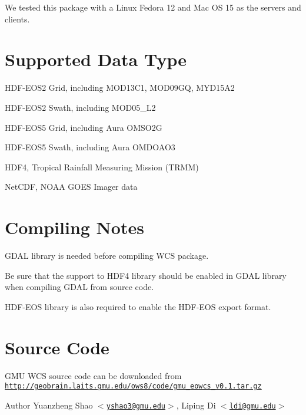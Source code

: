 We tested this package with a Linux Fedora 12 and Mac OS 15 as the servers and clients.\hypertarget{index_supportformats}{}\section{Supported Data Type}\label{index_supportformats}

\begin{DoxyItemize}
\item HDF-\/EOS2 Grid, including MOD13C1, MOD09GQ, MYD15A2
\item HDF-\/EOS2 Swath, including MOD05\_\-L2
\item HDF-\/EOS5 Grid, including Aura OMSO2G
\item HDF-\/EOS5 Swath, including Aura OMDOAO3
\item HDF4, Tropical Rainfall Measuring Mission (TRMM)
\item NetCDF, NOAA GOES Imager data
\end{DoxyItemize}\hypertarget{index_compilenotes}{}\section{Compiling Notes}\label{index_compilenotes}
GDAL library is needed before compiling WCS package.\par
 Be sure that the support to HDF4 library should be enabled in GDAL library when compiling GDAL from source code.\par
 HDF-\/EOS library is also required to enable the HDF-\/EOS export format.\hypertarget{index_sourceCode}{}\section{Source Code}\label{index_sourceCode}
GMU WCS source code can be downloaded from \href{http://geobrain.laits.gmu.edu/ows8/code/gmu_eowcs_v0.1.tar.gz}{\tt http://geobrain.laits.gmu.edu/ows8/code/gmu\_\-eowcs\_\-v0.1.tar.gz}

\begin{DoxyAuthor}{Author}
Yuanzheng Shao $<$\href{mailto:yshao3@gmu.edu}{\tt yshao3@gmu.edu}$>$, Liping Di $<$\href{mailto:ldi@gmu.edu}{\tt ldi@gmu.edu}$>$ 
\end{DoxyAuthor}
